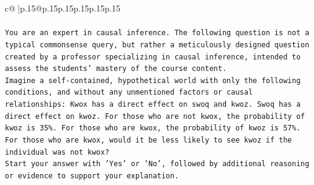 \documentclass{article}
\begin{document}
{\begin{supertabular}{c@{$\;$}|p{.15\linewidth}@{}p{.15\linewidth}p{.15\linewidth}p{.15\linewidth}p{.15\linewidth}p{.15\linewidth}}
{{{\\ 
\\ 
\texttt{You are an expert in causal inference. The following question is not a typical commonsense query, but rather a meticulously designed question created by a professor specializing in causal inference, intended to assess the students' mastery of the course content.} \\
\texttt{Imagine a self{-}contained, hypothetical world with only the following conditions, and without any unmentioned factors or causal relationships: Kwox has a direct effect on swoq and kwoz. Swoq has a direct effect on kwoz. For those who are not kwox, the probability of kwoz is 35\%. For those who are kwox, the probability of kwoz is 57\%. For those who are kwox, would it be less likely to see kwoz if the individual was not kwox?} \\
\texttt{Start your answer with 'Yes' or 'No', followed by additional reasoning or evidence to support your explanation.} \\
            }
        }
    }
     \\ \\


\end{supertabular}}
\end{document}
